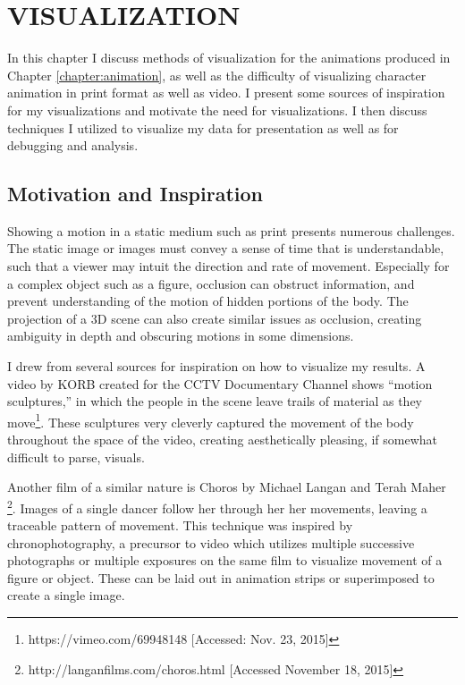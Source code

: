 
 
\chapter{VISUALIZATION}
\label{chapter:visualization}
In this chapter I discuss methods of visualization for the animations produced in Chapter \ref{chapter:animation}, as well as the difficulty of visualizing character animation in print format as well as video.  I present some sources of inspiration for my visualizations and motivate the need for visualizations.  I then discuss techniques I utilized to visualize my data for presentation as well as for debugging and analysis.

\section{Motivation and Inspiration}
\label{section:vis_insp}
Showing a motion in a static medium such as print presents numerous challenges.  The static image or images must convey a sense of time that is understandable, such that a viewer may intuit the direction and rate of movement.  Especially for a complex object such as a figure, occlusion can obstruct information, and prevent understanding of the motion of hidden portions of the body.  The projection of a 3D scene can also create similar issues as occlusion, creating ambiguity in depth and obscuring motions in some dimensions.

I drew from several sources for inspiration on how to visualize my results.  A video by KORB created for the CCTV Documentary Channel shows ``motion sculptures,'' in which the people in the scene leave trails of material as they move\footnote{https://vimeo.com/69948148 [Accessed: Nov. 23, 2015]}.  These sculptures very cleverly captured the movement of the body throughout the space of the video, creating aesthetically pleasing, if somewhat difficult to parse, visuals.

Another film of a similar nature is Choros by Michael Langan and Terah Maher \footnote{http://langanfilms.com/choros.html [Accessed November 18, 2015]}.  Images of a single dancer follow her through her her movements, leaving a traceable pattern of movement.  This technique was inspired by chronophotography, a precursor to video which utilizes multiple successive photographs or multiple exposures on the same film to visualize movement of a figure or object.  These can be laid out in animation strips or superimposed to create a single image.

